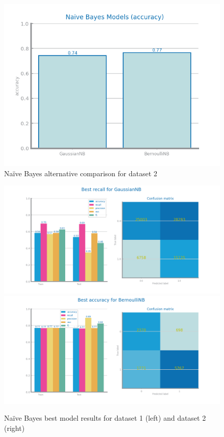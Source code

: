 \documentclass[10pt]{extarticle}
\begin{document}
\begin{figure}[H]
\centering\includegraphics[scale=0.95]{images/dataset2/models_evaluation/Credit_Score_nb_accuracy_study.png}
\caption{Na{\"i}ve Bayes alternative comparison for dataset 2}
\end{figure}

\begin{figure}[H]
\centering\includegraphics[scale=0.95]{images/dataset1/models_evaluation/CovidPos_GaussianNB_best_recall_eval.png}
\includegraphics[scale=0.95]{images/dataset2/models_evaluation/Credit_Score_nb_BernoulliNB_best_accuracy_eval.png}
\caption{Na{\"i}ve Bayes best model results for dataset 1 (left) and dataset 2 (right)}
\end{figure}
\end{document}
